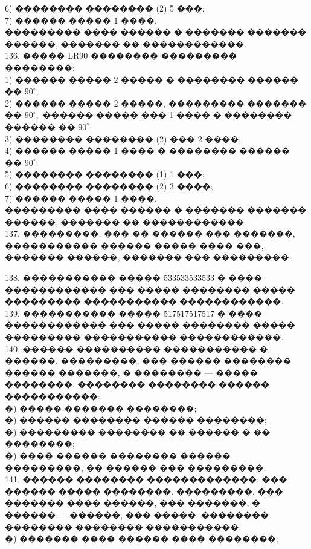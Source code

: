 \documentclass[12pt]{article}
\begin{document}
6) �������� �������� (2) 5 ���;\\
7) ������ ����� 1 ����.\\
��������� ���� ������ � ������� ������� ������, ������� �� ������������.\\
136. ����� LR90 �������� ��������� ��������:\\
1) ������ ����� 2 ����� � �������� ������ �� $90^\circ$;\\
2) ������ ����� 2 �����, ��������� ������� �� $90^\circ,$ ������ ����� ��� 1 ���� � �������� ������ �� $90^\circ$;\\
3) �������� �������� (2) ��� 2 ����;\\
4) ������ ����� 1 ���� � �������� ������ �� $90^\circ$;\\
5) �������� �������� (1) 1 ���;\\
6) �������� �������� (2) 3 ����;\\
7) ������ ����� 1 ����.\\
��������� ���� ������ � ������� ������� ������, ������� �� ������������.\\
137. ���������, ��� �� ������ ��� �������, ����������� ������ ����� ���� ���, ������� ������, ������� ��� ���������.
\begin{center}
\begin{figure}[ht!]
\end{figure}
\end{center}
138. ����������� ����� 533533533533 � ���� ������������ ��� ����� �������� ����� ��������� ����������� ������������.\\
139. ����������� ����� 517517517517 � ���� ������������ ��� ����� �������� ����� ��������� ����������� ������������.\\
140. ������ ���������� ����������� � ������. ���������, ��� ������ �������� ������ �������, � �������� --- ����� ��������. �������� �������� ������ �����������:\\
�) ����� ������� ��������;\\
�) ������ �������� ������ ��������;\\
�) ��������� �������� �� ������ � �� ��������;\\
�) ���� ������ �������� ������ ���������, �� ������ ��� ���������.\\
141. ������ �������� �������������, ��� ������ ����� ��������. ���������, ��� ������� ���� ������, ��� �������, � ������ --- ������, ��� �����. �������� �������� �������� �����������:\\
�) ������� ���� ������ ���� ��������;\\
\end{document}
